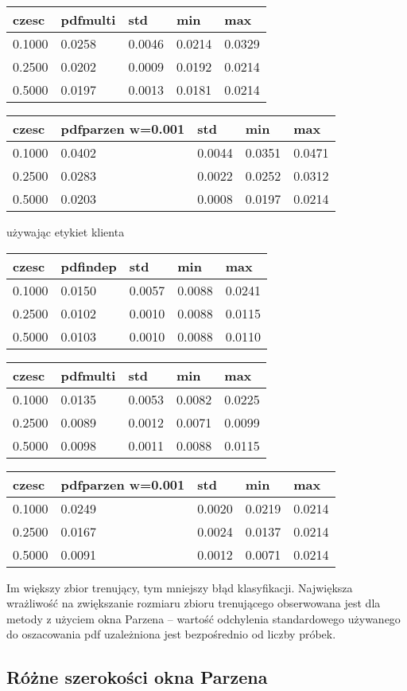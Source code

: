 \documentclass[11pt]{article}
\begin{document}
\begin{longtable}[]{@{}lllll@{}}
\toprule
czesc & pdfmulti & std & min & max\tabularnewline
\midrule
\endhead
0.1000 & 0.0258 & 0.0046 & 0.0214 & 0.0329\tabularnewline
0.2500 & 0.0202 & 0.0009 & 0.0192 & 0.0214\tabularnewline
0.5000 & 0.0197 & 0.0013 & 0.0181 & 0.0214\tabularnewline
\bottomrule
\end{longtable}

\begin{longtable}[]{@{}lllll@{}}
\toprule
czesc & pdfparzen w=0.001 & std & min & max\tabularnewline
\midrule
\endhead
0.1000 & 0.0402 & 0.0044 & 0.0351 & 0.0471\tabularnewline
0.2500 & 0.0283 & 0.0022 & 0.0252 & 0.0312\tabularnewline
0.5000 & 0.0203 & 0.0008 & 0.0197 & 0.0214\tabularnewline
\bottomrule
\end{longtable}

używając etykiet klienta

\begin{longtable}[]{@{}lllll@{}}
\toprule
czesc & pdfindep & std & min & max\tabularnewline
\midrule
\endhead
0.1000 & 0.0150 & 0.0057 & 0.0088 & 0.0241\tabularnewline
0.2500 & 0.0102 & 0.0010 & 0.0088 & 0.0115\tabularnewline
0.5000 & 0.0103 & 0.0010 & 0.0088 & 0.0110\tabularnewline
\bottomrule
\end{longtable}

\begin{longtable}[]{@{}lllll@{}}
\toprule
czesc & pdfmulti & std & min & max\tabularnewline
\midrule
\endhead
0.1000 & 0.0135 & 0.0053 & 0.0082 & 0.0225\tabularnewline
0.2500 & 0.0089 & 0.0012 & 0.0071 & 0.0099\tabularnewline
0.5000 & 0.0098 & 0.0011 & 0.0088 & 0.0115\tabularnewline
\bottomrule
\end{longtable}

\begin{longtable}[]{@{}lllll@{}}
\toprule
czesc & pdfparzen w=0.001 & std & min & max\tabularnewline
\midrule
\endhead
0.1000 & 0.0249 & 0.0020 & 0.0219 & 0.0214\tabularnewline
0.2500 & 0.0167 & 0.0024 & 0.0137 & 0.0214\tabularnewline
0.5000 & 0.0091 & 0.0012 & 0.0071 & 0.0214\tabularnewline
\bottomrule
\end{longtable}

Im większy zbior trenujący, tym mniejszy błąd klasyfikacji. Największa
wrażliwość na zwiększanie rozmiaru zbioru trenującego obserwowana jest
dla metody z użyciem okna Parzena -- wartość odchylenia standardowego
używanego do oszacowania pdf uzależniona jest bezpośrednio od liczby
próbek.

\subsection{Różne szerokości okna
Parzena}\label{ruxf3ux17cne-szerokoux15bci-okna-parzena}
\end{document}
